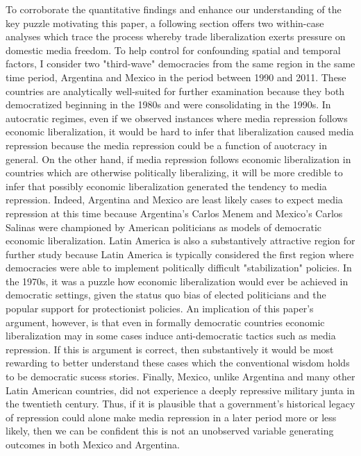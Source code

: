 \documentclass[a4paper]{article}\usepackage[]{graphicx}\usepackage[]{color}
\begin{document}
To corroborate the quantitative findings and enhance our understanding of the key puzzle motivating this paper, a following section offers two within-case analyses which trace the process whereby trade liberalization exerts pressure on domestic media freedom. To help control for confounding spatial and temporal factors, I consider two "third-wave" democracies from the same region in the same time period, Argentina and Mexico in the period between 1990 and 2011. These countries are analytically well-suited for further examination because they both democratized beginning in the 1980s and were consolidating in the 1990s. In autocratic regimes, even if we observed instances where media repression follows economic liberalization, it would be hard to infer that liberalization caused media repression because the media repression could be a function of auotcracy in general. On the other hand, if media repression follows economic liberalization in countries which are otherwise politically liberalizing, it will be more credible to infer that possibly economic liberalization generated the tendency to media repression. Indeed, Argentina and Mexico are least likely cases to expect media repression at this time because Argentina's Carlos Menem and Mexico's Carlos Salinas were championed by American politicians as models of democratic economic liberalization. Latin America is also a substantively attractive region for further study because Latin America is typically considered the first region where democracies were able to implement politically difficult "stabilization" policies. In the 1970s, it was a puzzle how economic liberalization would ever be achieved in democratic settings, given the status quo bias of elected politicians and the popular support for protectionist policies. An implication of this paper's argument, however, is that even in formally democratic countries economic liberalization may in some cases induce anti-democratic tactics such as media repression. If this is argument is correct, then substantively it would be most rewarding to better understand these cases which the conventional wisdom holds to be democratic sucess stories. Finally, Mexico, unlike Argentina and many other Latin American countries, did not experience a deeply repressive military junta in the twentieth century. Thus, if it is plausible that a government's historical legacy of repression could alone make media repression in a later period more or less likely, then we can be confident this is not an unobserved variable generating outcomes in both Mexico and Argentina.
\end{document}
